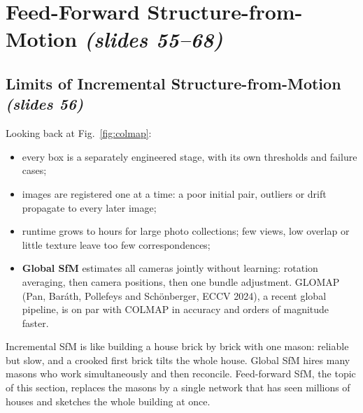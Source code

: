 \documentclass[11pt,a4paper]{article}
\newcommand{\slr}[1]{\texorpdfstring{\emph{(slides #1)}}{(slides #1)}}
\begin{document}
\section{Feed-Forward Structure-from-Motion \slr{55--68}}

\subsection{Limits of Incremental Structure-from-Motion \slr{56}}
Looking back at Fig.~\ref{fig:colmap}:
\begin{itemize}
\item every box is a separately engineered stage, with its own thresholds and failure cases;
\item images are registered one at a time: a poor initial pair, outliers or drift propagate to every later image;
\item runtime grows to hours for large photo collections; few views, low overlap or little texture leave too few correspondences;
\item \textbf{Global SfM} estimates all cameras jointly without learning: rotation averaging, then camera positions, then one bundle adjustment. GLOMAP (Pan, Bar\'ath, Pollefeys and Sch\"onberger, ECCV 2024), a recent global pipeline, is on par with COLMAP in accuracy and orders of magnitude faster.
\end{itemize}

\begin{intuition}
Incremental SfM is like building a house brick by brick with one mason: reliable but slow, and a crooked first brick tilts the whole house. Global SfM hires many masons who work simultaneously and then reconcile. Feed-forward SfM, the topic of this section, replaces the masons by a single network that has seen millions of houses and sketches the whole building at once.
\end{intuition}
\end{document}
